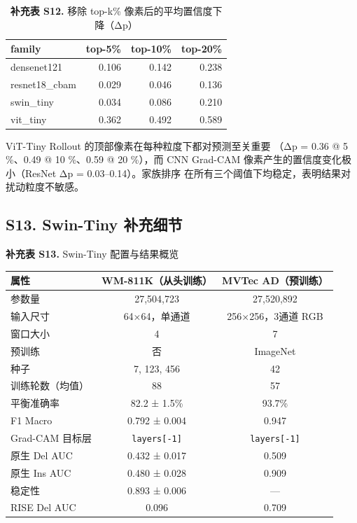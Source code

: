 \documentclass[11pt,a4paper]{article}
\begin{document}
\begin{table}[htbp]
\centering
\small
\caption{\textbf{补充表 S12.} 移除 top-k\% 像素后的平均置信度下降（Δp）}
\begin{tabular}{lrrr}
\toprule
family & top-5\% & top-10\% & top-20\% \\
\midrule
densenet121 & 0.106 & 0.142 & 0.238 \\
resnet18\_cbam & 0.029 & 0.046 & 0.136 \\
swin\_tiny & 0.034 & 0.086 & 0.210 \\
vit\_tiny & 0.362 & 0.492 & 0.589 \\
\bottomrule
\end{tabular}
\end{table}

ViT-Tiny Rollout 的顶部像素在每种粒度下都对预测至关重要 （Δp = 0.36 @ 5 \%、0.49 @ 10 \%、0.59 @ 20 \%），而 CNN Grad-CAM 像素产生的置信度变化极小（ResNet Δp = 0.03–0.14）。家族排序 在所有三个阈值下均稳定，表明结果对扰动粒度不敏感。


\subsection*{S13. Swin-Tiny 补充细节}

\begin{center}
\small \textbf{补充表 S13.} Swin-Tiny 配置与结果概览
\end{center}

\begin{tabular}{lcc}
\toprule
属性 & WM-811K（从头训练） & MVTec AD（预训练） \\
\midrule
参数量 & 27,504,723 & 27,520,892 \\
输入尺寸 & 64×64，单通道 & 256×256，3通道 RGB \\
窗口大小 & 4 & 7 \\
预训练 & 否 & ImageNet \\
种子 & 7, 123, 456 & 42 \\
训练轮数（均值） & 88 & 57 \\
平衡准确率 & 82.2 ± 1.5\% & 93.7\% \\
F1 Macro & 0.792 ± 0.004 & 0.947 \\
Grad-CAM 目标层 & \texttt{layers[-1]} & \texttt{layers[-1]} \\
原生 Del AUC & 0.432 ± 0.017 & 0.509 \\
原生 Ins AUC & 0.480 ± 0.028 & 0.909 \\
稳定性 & 0.893 ± 0.006 & — \\
RISE Del AUC & 0.096 & 0.709 \\
\bottomrule
\end{tabular}
\end{document}
